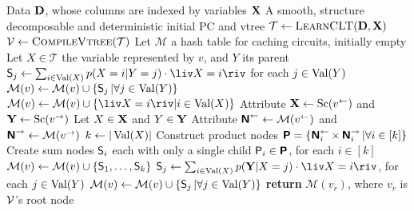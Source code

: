 \begin{algorithm}[t]
  \caption{}\label{alg:strudelinit}
  \begin{algorithmic}[1]
    \Require Data $\mathbf{D}$, whose columns are indexed by variables $\mathbf{X}$
    \Ensure A smooth, structure decomposable and deterministic initial PC and vtree
    \State $\mathcal{T}\gets\textproc{LearnCLT}(\set{D},\set{X})$
    \State $\vtree\gets\textproc{CompileVtree}(\mathcal{T})$
    \State Let $\mathcal{M}$ a hash table for caching circuits, initially empty
        \State Let $X\in\mathcal{T}$ the variable represented by $v$, and $Y$ its parent
          \State $\Sum_j\gets\sum_{i\in\Val(X)}p(X=i|Y=j)\cdot\liv X=i\riv$ for each $j\in\operatorname*{\normalfont{Val}}(Y)$
          \State $\mathcal{M}(v)\gets\mathcal{M}(v)\cup\{\operatorname{\textsf{S}}_j|\forall j\in\operatorname*{\normalfont{Val}}(Y)\}$
        \Else
          \State $\mathcal{M}(v)\gets\mathcal{M}(v)\cup\{\liv X=i\riv|i\in\Val(X)\}$
        \EndIf
      \Else
        \State Attribute $\mathbf{X}\gets\operatorname*{\normalfont{Sc}}(v^\gets)$ and $\mathbf{Y}\gets\operatorname*{\normalfont{Sc}}(v^\to)$
        \State Let $X\in\mathbf{X}$ and $Y\in\mathbf{Y}$
        \State Attribute $\operatorname{\textsf{\textbf{N}}}^\gets\gets\mathcal{M}(v^\gets)$ and $\operatorname{\textsf{\textbf{N}}}^\to\gets\mathcal{M}(v^\to)$
        \State $k\gets|\operatorname*{\normalfont{Val}}(X)|$
        \State Construct product nodes $\operatorname{\textsf{\textbf{P}}}=\{\operatorname{\textsf{\textbf{N}}}_i^\gets\times\operatorname{\textsf{\textbf{N}}}_i^\to|\forall i\in\left[k\right]\}$
          \State Create sum nodes $\operatorname{\textsf{S}}_i$ each with only a single child $\operatorname{\textsf{P}}_i\in\operatorname{\textsf{\textbf{P}}}$, for each $i\in\left[k\right]$
          \State $\mathcal{M}(v)\gets\mathcal{M}(v)\cup\{\operatorname{\textsf{S}}_1,\ldots,\operatorname{\textsf{S}}_k\}$
        \Else
          \State $\Sum_j\gets\sum_{i\in\Val(X)}p(\set{Y}|X=j)\cdot\liv X=i\riv$, for each $j\in\operatorname*{\normalfont{Val}}(Y)$
          \State $\mathcal{M}(v)\gets\mathcal{M}(v)\cup\{\operatorname{\textsf{S}}_j|\forall j\in\operatorname*{\normalfont{Val}}(Y)\}$
        \EndIf
      \EndIf
    \EndFor
    \State \textbf{return} $\mathcal{M}(v_r)$, where $v_r$ is $\operatorname{\mathcal{V}}$'s root node
  \end{algorithmic}
\end{algorithm}

